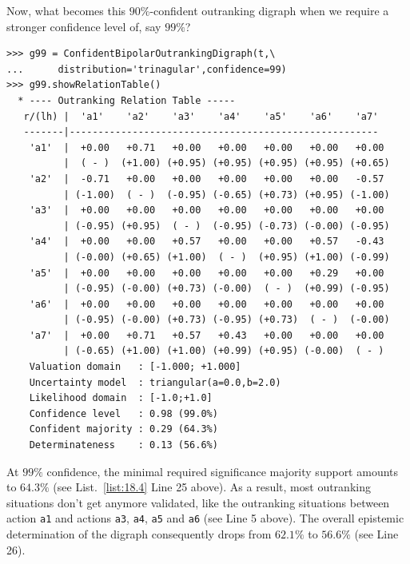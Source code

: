 Now, what becomes this $90\%$-confident outranking digraph when we require a stronger confidence level of, say $99\%$?
\begin{lstlisting}[caption={$99\%$-confident outranking relation},label=list:18.4,basicstyle=\ttfamily\scriptsize]
>>> g99 = ConfidentBipolarOutrankingDigraph(t,\
...      distribution='trinagular',confidence=99)
>>> g99.showRelationTable()
  * ---- Outranking Relation Table -----
   r/(lh) |  'a1'    'a2'    'a3'    'a4'    'a5'    'a6'    'a7'	 
   -------|------------------------------------------------------
    'a1'  |  +0.00   +0.71   +0.00   +0.00   +0.00   +0.00   +0.00  
          |  ( - )  (+1.00) (+0.95) (+0.95) (+0.95) (+0.95) (+0.65) 
    'a2'  |  -0.71   +0.00   +0.00   +0.00   +0.00   +0.00   -0.57  
          | (-1.00)  ( - )  (-0.95) (-0.65) (+0.73) (+0.95) (-1.00) 
    'a3'  |  +0.00   +0.00   +0.00   +0.00   +0.00   +0.00   +0.00  
          | (-0.95) (+0.95)  ( - )  (-0.95) (-0.73) (-0.00) (-0.95) 
    'a4'  |  +0.00   +0.00   +0.57   +0.00   +0.00   +0.57   -0.43  
          | (-0.00) (+0.65) (+1.00)  ( - )  (+0.95) (+1.00) (-0.99) 
    'a5'  |  +0.00   +0.00   +0.00   +0.00   +0.00   +0.29   +0.00  
          | (-0.95) (-0.00) (+0.73) (-0.00)  ( - )  (+0.99) (-0.95) 
    'a6'  |  +0.00   +0.00   +0.00   +0.00   +0.00   +0.00   +0.00  
          | (-0.95) (-0.00) (+0.73) (-0.95) (+0.73)  ( - )  (-0.00) 
    'a7'  |  +0.00   +0.71   +0.57   +0.43   +0.00   +0.00   +0.00  
          | (-0.65) (+1.00) (+1.00) (+0.99) (+0.95) (-0.00)  ( - )  
    Valuation domain   : [-1.000; +1.000] 
    Uncertainty model  : triangular(a=0.0,b=2.0) 
    Likelihood domain  : [-1.0;+1.0] 
    Confidence level   : 0.98 (99.0%) 
    Confident majority : 0.29 (64.3%) 
    Determinateness    : 0.13 (56.6%)
\end{lstlisting}

At $99\%$ confidence, the minimal required significance majority support amounts to $64.3\%$ (see List.~\ref{list:18.4} Line 25 above). As a result, most outranking situations don't get anymore validated, like the outranking situations between action \texttt{a1} and actions \texttt{a3}, \texttt{a4}, \texttt{a5} and \texttt{a6} (see Line 5 above). The overall epistemic determination of the digraph consequently drops from $62.1\%$ to $56.6\%$ (see Line 26).

